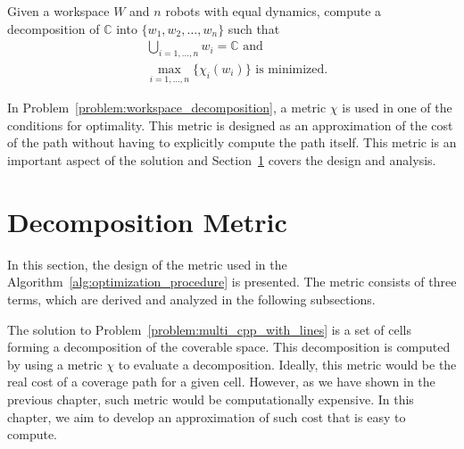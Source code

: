 \documentclass[../main.tex]{subfiles}
\begin{document}
\begin{problem}
\label{problem:workspace_decomposition}
	Given a workspace $W$ and $n$ robots with equal dynamics, compute a decomposition of $\mathbb{C}$ into $\{w_1,w_2,\dots,w_n\}$ such that
	\begin{equation}
	\begin{aligned}
		& \bigcup_{i=1,\dots,n}w_i=\mathbb{C}\text{ and}\\
		& \max_{i=1,\ldots,n}\{\chi_i(w_i)\}\text{ is minimized.}
	\end{aligned}
	\end{equation}
\end{problem}
In Problem~\ref{problem:workspace_decomposition}, a metric $\chi$ is used in one of the conditions for optimality. This metric is designed as an approximation of the cost of the path without having to explicitly compute the path itself. This metric is an important aspect of the solution and Section~\ref{section:multi_decomposition_metric} covers the design and analysis.

\section{Decomposition Metric}
\label{section:multi_decomposition_metric}

In this section, the design of  the metric used in the Algorithm~\ref{alg:optimization_procedure} is presented. The metric consists of three terms, which are derived and analyzed in the following subsections.

The solution to Problem~\ref{problem:multi_cpp_with_lines} is a set of cells forming a decomposition of the coverable space. This decomposition is computed by using a metric $\chi$ to evaluate a decomposition. Ideally, this metric would be the real cost of a coverage path for a given cell. However, as we have shown in the previous chapter, such metric would be computationally expensive. In this chapter, we aim to develop an approximation of such cost that is easy to compute. 
\end{document}
